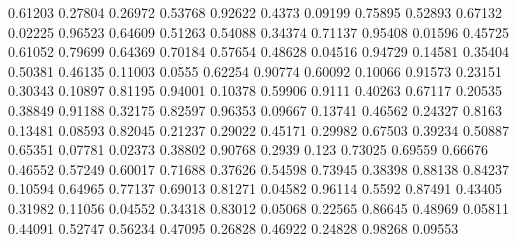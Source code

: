 \documentclass{article}
\newenvironment{eulernotebook}{\par}{\par}
\newenvironment{eulercomment}{\par\medskip}{\par\medskip}
\begin{document}
\begin{eulernotebook}
\begin{eulercomment}
\begin{eulercomment}
\begin{eulercomment}
\begin{eulercomment}
\begin{eulercomment}
\begin{eulercomment}
\begin{euleroutput}
              0.61203
              0.27804
              0.26972
              0.53768
              0.92622
               0.4373
              0.09199
              0.75895
              0.52893
              0.67132
              0.02225
              0.96523
              0.64609
              0.51263
              0.54088
              0.34374
              0.71137
              0.95408
              0.01596
              0.45725
              0.61052
              0.79699
              0.64369
              0.70184
              0.57654
              0.48628
              0.04516
              0.94729
              0.14581
              0.35404
              0.50381
              0.46135
              0.11003
               0.0555
              0.62254
              0.90774
              0.60092
              0.10066
              0.91573
              0.23151
              0.30343
              0.10897
              0.81195
              0.94001
              0.10378
              0.59906
               0.9111
              0.40263
              0.67117
              0.20535
              0.38849
              0.91188
              0.32175
              0.82597
              0.96353
              0.09667
              0.13741
              0.46562
              0.24327
               0.8163
              0.13481
              0.08593
              0.82045
              0.21237
              0.29022
              0.45171
              0.29982
              0.67503
              0.39234
              0.50887
              0.65351
              0.07781
              0.02373
              0.38802
              0.90768
               0.2939
                0.123
              0.73025
              0.69559
              0.66676
              0.46552
              0.57249
              0.60017
              0.71688
              0.37626
              0.54598
              0.73945
              0.38398
              0.88138
              0.84237
              0.10594
              0.64965
              0.77137
              0.69013
              0.81271
              0.04582
              0.96114
               0.5592
              0.87491
              0.43405
              0.31982
              0.11056
              0.04552
              0.34318
              0.83012
              0.05068
              0.22565
              0.86645
              0.48969
              0.05811
              0.44091
              0.52747
              0.56234
              0.47095
              0.26828
              0.46922
              0.24828
              0.98268
              0.09553

\end{euleroutput}
\end{eulercomment}
\end{eulercomment}
\end{eulercomment}
\end{eulercomment}
\end{eulercomment}
\end{eulercomment}
\end{eulernotebook}
\end{document}
